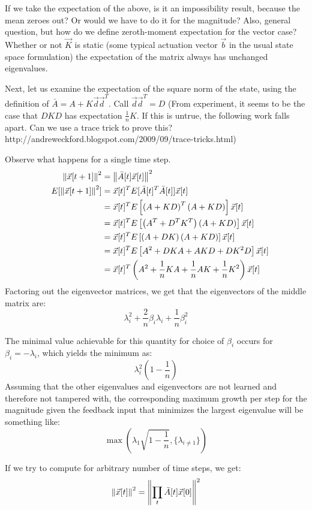 \documentclass[letterpaper]{article}
\theoremstyle{remark}
\newcommand{\eqn}[1]{\begin{alignat*}{2}#1\end{alignat*}}
\begin{document}
If we take the expectation of the above, is it an impossibility result, because the mean zeroes out? Or would we have to do it for the magnitude? Also, general question, but how do we define zeroth-moment expectation for the vector case? Whether or not  $\vec{K}$ is static (some typical actuation vector $\vec{b}$ in the usual state space formulation) the expectation of the matrix always has unchanged eigenvalues.

Next, let us examine the expectation of the square norm of the state, using the definition of $\bar{A} = A + K\vec{d}\vec{d}^T$. Call $\vec{d}\vec{d}^T = D$ (From experiment, it seems to be the case that $DKD$ has expectation $\frac{1}{n}K$. If this is untrue, the following work falls apart. Can we use a trace trick to prove this? http://andreweckford.blogspot.com/2009/09/trace-tricks.html)

Observe what happens for a single time step.
\eqn{
&&\norm{\vec{x}[t+1]}^2 &= \norm{\bar{A}[t]\vec{x}[t]}^2\\
&&E[\norm{\vec{x}[t+1]}^2]  &= \vec{x}[t]^TE[\bar{A}[t]^T\bar{A}[t]]\vec{x}[t]\\
&& &= \vec{x}[t]^TE\left[\left(A + KD\right)^T\left(A + KD\right)\right]\vec{x}[t]\\
&& &= \vec{x}[t]^TE\left[\left(A^T + D^TK^T\right)\left(A + KD\right)\right]\vec{x}[t]\\
&& &=\vec{x}[t]^TE\left[\left(A + DK\right)\left(A + KD\right)\right]\vec{x}[t]\\
&& &= \vec{x}[t]^TE\left[A^2 + DKA + AKD + DK^2D\right]\vec{x}[t]\\
&& &= \vec{x}[t]^T\left(A^2 + \frac{1}{n}KA + \frac{1}{n}AK + \frac{1}{n}K^2\right)\vec{x}[t]\\
}
Factoring out the eigenvector matrices, we get that the eigenvectors of the middle matrix are:
\[
\lambda_i^2 + \frac{2}{n}\beta_i\lambda_i + \frac{1}{n}\beta_i^2
\]

The minimal value achievable for this quantity for choice of $\beta_i$ occurs for $\beta_i = -\lambda_i$, which yields the minimum as:
\[
\lambda_i^2\left(1 - \frac{1}{n}\right)
\]
Assuming that the other eigenvalues and eigenvectors are not learned and therefore not tampered with, the corresponding maximum growth per step for the magnitude given the feedback input that minimizes the largest eigenvalue will be something like:
\[
\max\left(\lambda_1\sqrt{1-\frac{1}{n}}, \{\lambda_{i\ne 1}\}\right)
\]

If we try to compute for arbitrary number of time steps, we get:
\[
\norm{\vec{x}[t]}^2 = \norm{\prod_t\bar{A}[t]\vec{x}[0]}^2
\]
\end{document}
